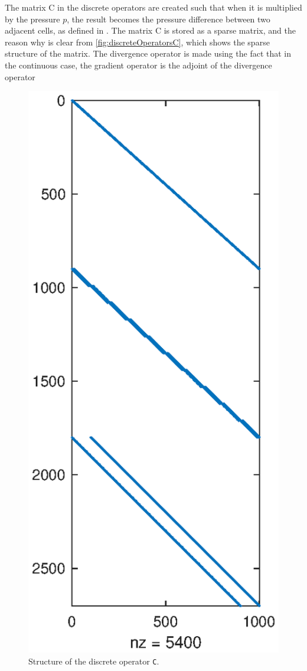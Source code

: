 The matrix C in the discrete operators are created such that when it is multiplied by the pressure $p$, the result becomes the pressure difference between two adjacent cells, as defined in . The matrix C is stored as a sparse matrix, and the reason why is clear from \autoref{fig:discreteOperatorsC}, which shows the sparse  structure of the matrix. The divergence operator is made using the fact that in the continuous case, the gradient operator is the adjoint of the divergence operator
\begin{figure}
    \includegraphics[width=\linewidth]{figures/flowSolver_discrete_operators_C.eps}
    \caption{Structure of the discrete operator \texttt{C}.}
    \label{fig:discreteOperatorsC}
\end{figure}
